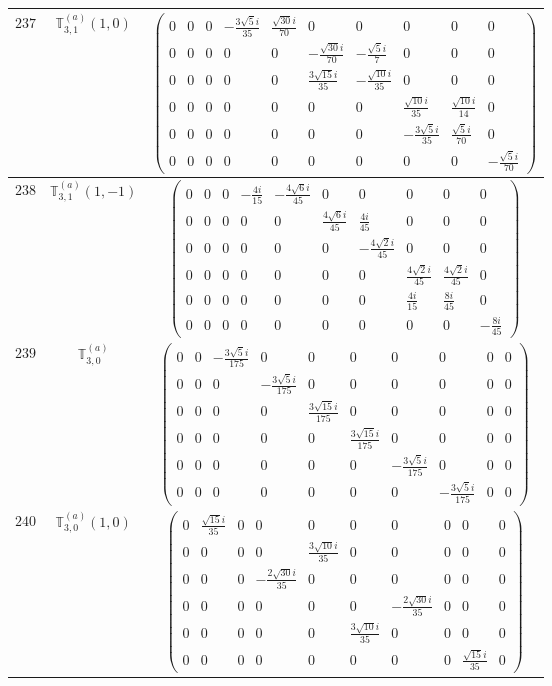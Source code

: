 \documentclass[fleqn,8pt,landscape]{jsarticle}
\begin{document}
\begin{center}
\begin{longtable}{ccc}
$ 237 $ & $ \mathbb{T}_{3,1}^{(a)}(1,0) $ & $ \begin{pmatrix} 0 & 0 & 0 & - \frac{3 \sqrt{5} i}{35} & \frac{\sqrt{30} i}{70} & 0 & 0 & 0 & 0 & 0 \\ 0 & 0 & 0 & 0 & 0 & - \frac{\sqrt{30} i}{70} & - \frac{\sqrt{5} i}{7} & 0 & 0 & 0 \\ 0 & 0 & 0 & 0 & 0 & \frac{3 \sqrt{15} i}{35} & - \frac{\sqrt{10} i}{35} & 0 & 0 & 0 \\ 0 & 0 & 0 & 0 & 0 & 0 & 0 & \frac{\sqrt{10} i}{35} & \frac{\sqrt{10} i}{14} & 0 \\ 0 & 0 & 0 & 0 & 0 & 0 & 0 & - \frac{3 \sqrt{5} i}{35} & \frac{\sqrt{5} i}{70} & 0 \\ 0 & 0 & 0 & 0 & 0 & 0 & 0 & 0 & 0 & - \frac{\sqrt{5} i}{70} \end{pmatrix} $ \\ \hline
$ 238 $ & $ \mathbb{T}_{3,1}^{(a)}(1,-1) $ & $ \begin{pmatrix} 0 & 0 & 0 & - \frac{4 i}{15} & - \frac{4 \sqrt{6} i}{45} & 0 & 0 & 0 & 0 & 0 \\ 0 & 0 & 0 & 0 & 0 & \frac{4 \sqrt{6} i}{45} & \frac{4 i}{45} & 0 & 0 & 0 \\ 0 & 0 & 0 & 0 & 0 & 0 & - \frac{4 \sqrt{2} i}{45} & 0 & 0 & 0 \\ 0 & 0 & 0 & 0 & 0 & 0 & 0 & \frac{4 \sqrt{2} i}{45} & \frac{4 \sqrt{2} i}{45} & 0 \\ 0 & 0 & 0 & 0 & 0 & 0 & 0 & \frac{4 i}{15} & \frac{8 i}{45} & 0 \\ 0 & 0 & 0 & 0 & 0 & 0 & 0 & 0 & 0 & - \frac{8 i}{45} \end{pmatrix} $ \\ \hline
$ 239 $ & $ \mathbb{T}_{3,0}^{(a)} $ & $ \begin{pmatrix} 0 & 0 & - \frac{3 \sqrt{5} i}{175} & 0 & 0 & 0 & 0 & 0 & 0 & 0 \\ 0 & 0 & 0 & - \frac{3 \sqrt{5} i}{175} & 0 & 0 & 0 & 0 & 0 & 0 \\ 0 & 0 & 0 & 0 & \frac{3 \sqrt{15} i}{175} & 0 & 0 & 0 & 0 & 0 \\ 0 & 0 & 0 & 0 & 0 & \frac{3 \sqrt{15} i}{175} & 0 & 0 & 0 & 0 \\ 0 & 0 & 0 & 0 & 0 & 0 & - \frac{3 \sqrt{5} i}{175} & 0 & 0 & 0 \\ 0 & 0 & 0 & 0 & 0 & 0 & 0 & - \frac{3 \sqrt{5} i}{175} & 0 & 0 \end{pmatrix} $ \\ \hline
$ 240 $ & $ \mathbb{T}_{3,0}^{(a)}(1,0) $ & $ \begin{pmatrix} 0 & \frac{\sqrt{15} i}{35} & 0 & 0 & 0 & 0 & 0 & 0 & 0 & 0 \\ 0 & 0 & 0 & 0 & \frac{3 \sqrt{10} i}{35} & 0 & 0 & 0 & 0 & 0 \\ 0 & 0 & 0 & - \frac{2 \sqrt{30} i}{35} & 0 & 0 & 0 & 0 & 0 & 0 \\ 0 & 0 & 0 & 0 & 0 & 0 & - \frac{2 \sqrt{30} i}{35} & 0 & 0 & 0 \\ 0 & 0 & 0 & 0 & 0 & \frac{3 \sqrt{10} i}{35} & 0 & 0 & 0 & 0 \\ 0 & 0 & 0 & 0 & 0 & 0 & 0 & 0 & \frac{\sqrt{15} i}{35} & 0 \end{pmatrix} $ \\ \hline

\end{longtable}
\end{center}
\end{document}
